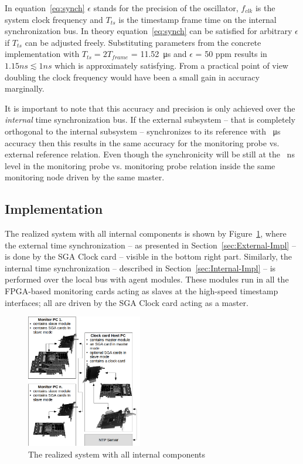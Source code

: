 \documentclass[journal]{IEEEtran}
\begin{document}
In equation~\ref{eq:synch} $\epsilon$ stands for the precision of the oscillator, $f_{clk}$  is the system clock frequency and $T_{ts}$ is the timestamp frame time on the internal synchronization bus. In theory equation~\ref{eq:synch} can be satisfied for arbitrary $\epsilon$ if $T_{ts}$ can be adjusted freely. Substituting parameters from the concrete implementation with $T_{ts} = 2T_{frame}$ = \SI{11.52}{\micro\second} and $\epsilon$ = 50 ppm results in $1.15 ns \lesssim 1 ns$ which is approximately satisfying. From a practical point of view doubling the clock frequency would have been a small gain in accuracy marginally.


It is important to note that this accuracy and precision is only achieved over the \emph{internal} time synchronization bus. If the external subsystem -- that is completely orthogonal to the internal subsystem -- synchronizes to its reference with \SI{}{\micro\second} accuracy then this results in the same accuracy for the monitoring probe vs. external reference relation. Even though the synchronicity will be still at the \SI{}{\nano\second} level in the monitoring probe vs. monitoring probe relation inside the same monitoring node driven by the same master.

\subsection{Implementation}

The realized system with all internal components is shown by Figure~\ref{fig:realized-system}, where the external time
synchronization -- as presented in Section~\ref{sec:External-Impl} -- is done by the SGA Clock card -- visible in the
bottom right part. Similarly, the internal time synchronization -- described in Section~\ref{sec:Internal-Impl} --
is performed over the local bus with agent modules. These modules run in all the FPGA-based monitoring cards acting as slaves at the
high-speed timestamp interfaces; all are driven by the SGA Clock card acting as a master.

\begin{figure}[H]
    \centering
    \includegraphics[width=0.45\textwidth]{figures_raw/clock_architecture.png}
    \caption{The realized system with all internal components}
    \label{fig:realized-system}
\end{figure}
\end{document}
